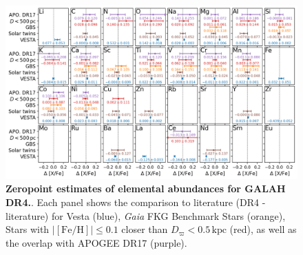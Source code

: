 \documentclass[
  journal=pasa,
  manuscript=research-paper, %
  year=2023,
  volume=37
]{cup-journal}
\newcommand{\Gaia}{\textit{Gaia}\xspace}
\begin{document}
\begin{figure}[ht]
 \centering
 \includegraphics[width=\textwidth]{figures/galah_dr4_zeropoint_checks_allstar.png}
 \caption{\textbf{Zeropoint estimates of elemental abundances for GALAH DR4.}. Each panel shows the comparison to literature (DR4 - literature) for Vesta (blue), \Gaia FKG Benchmark Stars (orange), Stars with $\vert \mathrm{[Fe/H]} \vert \leq 0.1$ closer than $D_\varpi < 0.5\,\mathrm{kpc}$ (red), as well as the overlap with APOGEE DR17 (purple).}
 \label{fig:galah_dr4_zeropoint_checks_allstar}
\end{figure}
\end{document}

